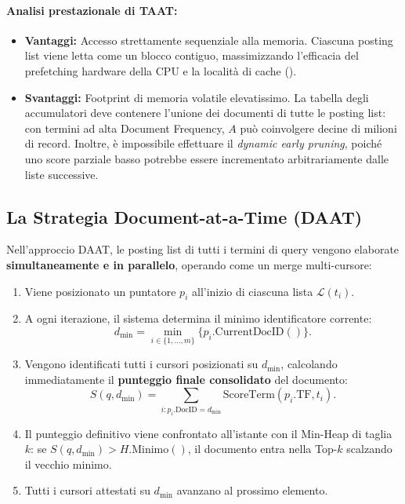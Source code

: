 \paragraph{Analisi prestazionale di TAAT:}
\begin{itemize}
    \item \textbf{Vantaggi:} Accesso strettamente sequenziale alla memoria. Ciascuna posting list viene letta come un blocco contiguo, massimizzando l'efficacia del prefetching hardware della CPU e la localit\`a di cache ().
    \item \textbf{Svantaggi:} Footprint di memoria volatile elevatissimo. La tabella degli accumulatori deve contenere l'unione dei documenti di tutte le posting list: con termini ad alta Document Frequency, $A$ pu\`o coinvolgere decine di milioni di record. Inoltre, \`e impossibile effettuare il \textit{dynamic early pruning}, poich\'e uno score parziale basso potrebbe essere incrementato arbitrariamente dalle liste successive.
\end{itemize}

\FloatBarrier
\subsection{La Strategia Document-at-a-Time (DAAT)}
Nell'approccio DAAT, le posting list di tutti i termini di query vengono elaborate \textbf{simultaneamente e in parallelo}, operando come un merge multi-cursore:
\begin{enumerate}
    \item Viene posizionato un puntatore $p_i$ all'inizio di ciascuna lista $\mathcal{L}(t_i)$.
    \item A ogni iterazione, il sistema determina il minimo identificatore corrente:
    \begin{equation}
    d_{\min} = \min_{i \in \{1, \dots, m\}} \{p_i.\text{CurrentDocID}()\}.
    \end{equation}
    \item Vengono identificati tutti i cursori posizionati su $d_{\min}$, calcolando immediatamente il \textbf{punteggio finale consolidato} del documento:
    \begin{equation}
    S(q, d_{\min}) = \sum_{i : p_i.\text{DocID} = d_{\min}} \text{ScoreTerm}(p_i.\text{TF}, t_i).
    \end{equation}
    \item Il punteggio definitivo viene confrontato all'istante con il Min-Heap di taglia $k$: se $S(q, d_{\min}) > H.\text{Minimo}()$, il documento entra nella Top-$k$ scalzando il vecchio minimo.
    \item Tutti i cursori attestati su $d_{\min}$ avanzano al prossimo elemento.
\end{enumerate}

